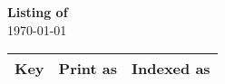 \documentclass{article}
\begin{document}
\begin{center}
{\Large\textbf{Listing of \@keyindexfile}}\\
\today
\end{center}

\renewcommand{\keyindexentry}[3]{%
\texttt{\detokenize{#1}} & 
\name{#1} & 
#3 \\}

\begin{longtable}{lll}
Key & Print as & Indexed as\\\hline

\end{longtable}
\end{document}
